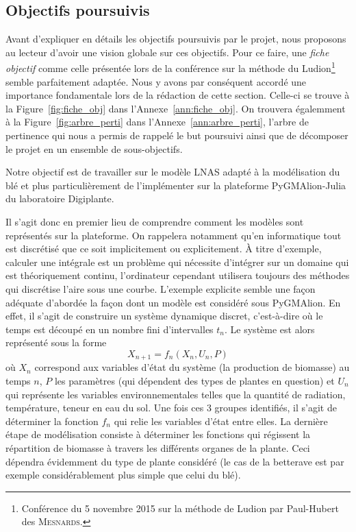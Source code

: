 \subsection{Objectifs poursuivis}
Avant d'expliquer en détails les objectifs poursuivis par le projet,
nous proposons au lecteur d'avoir une vision globale sur ces objectifs.
Pour ce faire, une \emph{fiche objectif} comme celle présentée 
lors de la conférence sur 
la méthode du Ludion\footnote{Conférence du 5 novembre 2015 
sur la méthode de Ludion par Paul-Hubert des \textsc{Mesnards}.} 
semble parfaitement adaptée.
Nous y avons par conséquent accordé une importance fondamentale
lors de la rédaction de cette section.
Celle-ci se trouve à la Figure~\ref{fig:fiche_obj} 
dans l'Annexe~\ref{ann:fiche_obj}.
On trouvera égalemment à la Figure~\ref{fig:arbre_perti}
dans l'Annexe~\ref{ann:arbre_perti}, l'arbre de pertinence
qui nous a permis de rappelé le but poursuivi ainsi
que de décomposer le projet en un ensemble de sous-objectifs.

Notre objectif est de travailler sur le modèle LNAS
adapté à la modélisation du blé et plus particulièrement de l'implémenter
sur la plateforme PyGMAlion-Julia du laboratoire Digiplante.


Il s'agit donc en premier lieu de comprendre comment les modèles
sont représentés sur la plateforme. 
On rappelera notamment qu'en informatique tout est discrétisé
que ce soit implicitement ou explicitement.
À titre d'exemple, calculer une intégrale est un problème
qui nécessite d'intégrer sur un domaine qui est théoriquement continu,
l'ordinateur cependant utilisera toujours des méthodes qui discrétise
l'aire sous une courbe.
L'exemple explicite semble une façon adéquate d'abordée
la façon dont un modèle est considéré sous PyGMAlion.
En effet, il s'agit de construire un système dynamique discret,
c'est-à-dire où le temps est découpé en un nombre fini d'intervalles $t_n$.
Le système est alors représenté sous la forme
\[
  X_{n+1} = f_n(X_n, U_n, P)
\]
où $X_n$ correspond aux variables d'état du système (la production
de biomasse) au temps $n$, $P$ les paramètres (qui dépendent des types
de plantes en question) et $U_n$ qui représente les variables
environnementales telles que la quantité de radiation, température,
teneur en eau du sol.
Une fois ces 3 groupes identifiés, il s'agit de déterminer la fonction $f_n$ qui relie les variables d'état entre elles.
La dernière étape de modélisation consiste à déterminer
les fonctions qui régissent la répartition de biomasse 
à travers les différents organes de la plante.
Ceci dépendra évidemment du type de plante considéré
(le cas de la betterave est par exemple considérablement
plus simple que celui du blé).

